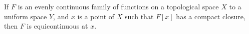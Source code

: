 If $F$ is an evenly continuous family of functions on a topological space $X$ to a uniform space $Y$, and $x$ is a point of $X$ such that $F[x]$ has a compact closure, then $F$ is equicontinuous at $x$.
